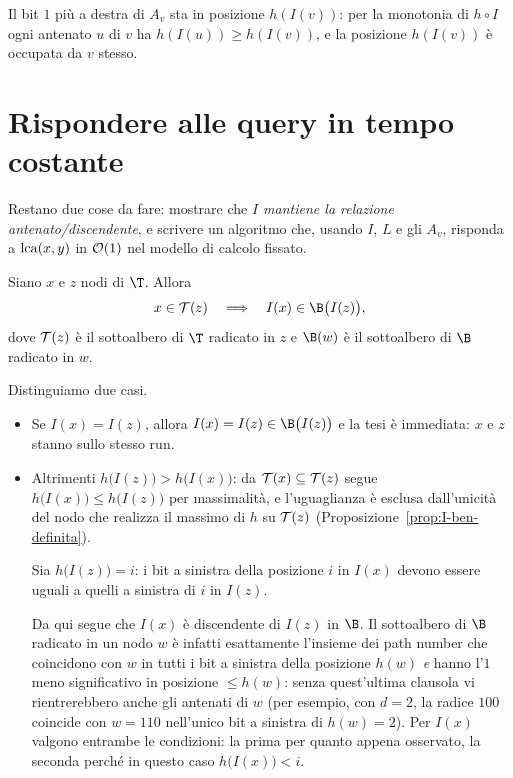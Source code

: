 \begin{osservazione}
  Il bit $1$ più a destra di $A_v$ sta in posizione $h(I(v))$: per
  la monotonia di $h\circ I$ ogni antenato $u$ di $v$ ha $h(I(u)) \ge h(I(v))$, e la
  posizione $h(I(v))$ è occupata da $v$ stesso.
\end{osservazione}

\section{Rispondere alle query in tempo costante}\label{sec:lca-query}


Restano due cose da fare: mostrare che \emph{$I$ mantiene la relazione
antenato/discendente}, e scrivere un algoritmo che, usando $I$, $L$ e gli $A_v$,
risponda a $\operatorname{lca}(x,y)$ in $\mathcal{O}(1)$ nel modello di calcolo fissato.

\begin{lemma}\label{lem:lca-I-ant}
  Siano $x$ e $z$ nodi di $\T$. Allora
  \[
    x\in\albero{z}
    \quad\Longrightarrow\quad
    I(x)\in\B\bigl(I(z)\bigr),
  \]
  dove $\mathcal{T}(z)$ è il sottoalbero di $\T$ radicato in $z$ e $\B(w)$ è il
  sottoalbero di $\B$ radicato in $w$.
\end{lemma}

\begin{dimostrazione*}
  Distinguiamo due casi.
  \begin{itemize}
    \item Se $I(x)=I(z)$, allora $I(x)=I(z)\in\B\bigl(I(z)\bigr)$ e la tesi è
          immediata: $x$ e $z$ stanno sullo stesso run.

    \item Altrimenti $h\bigl(I(z)\bigr)>h\bigl(I(x)\bigr)$: da
          $\mathcal{T}(x)\subseteq\mathcal{T}(z)$ segue
          $h\bigl(I(x)\bigr)\le h\bigl(I(z)\bigr)$ per massimalità, e l'uguaglianza è
          esclusa dall'unicità del nodo che realizza il massimo di $h$ su $\mathcal{T}(z)$
          (Proposizione~\ref{prop:I-ben-definita}).

          Sia $h\bigl(I(z)\bigr)=i$: i bit a sinistra della posizione $i$ in $I(x)$
          devono essere uguali a quelli a sinistra di $i$ in $I(z)$.

          Da qui segue che $I(x)$ è discendente di $I(z)$ in $\B$. Il sottoalbero di
          $\B$ radicato in un nodo $w$ è infatti esattamente l'insieme dei path number
          che coincidono con $w$ in tutti i bit a sinistra della posizione $h(w)$
          \emph{e} hanno l'$1$ meno significativo in posizione $\le h(w)$: senza
          quest'ultima clausola vi rientrerebbero anche gli antenati di $w$ (per
          esempio, con $d=2$, la radice $100$ coincide con $w=110$ nell'unico bit a
          sinistra di $h(w)=2$). Per $I(x)$ valgono entrambe le condizioni: la prima
          per quanto appena osservato, la seconda perché in questo caso
          $h\bigl(I(x)\bigr)<i$.
  \end{itemize}
\end{dimostrazione*}

